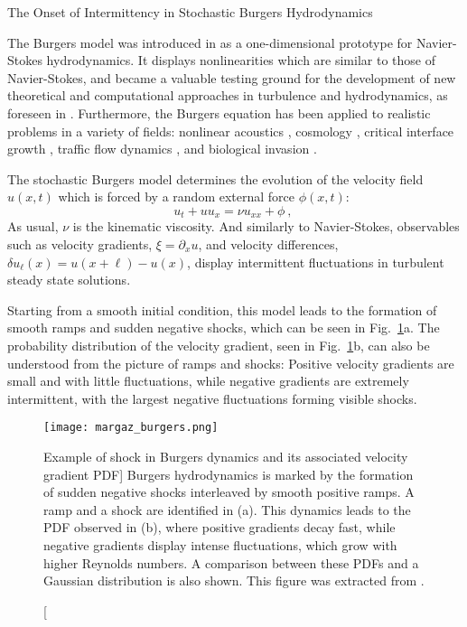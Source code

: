 \begin{chapter}{The Onset of Intermittency in Stochastic Burgers Hydrodynamics}
\label{chap:burgers}

\hspace{5 mm} 

The Burgers model was introduced in \textcite{burgers1948} as a one-dimensional prototype for Navier-Stokes hydrodynamics. It displays nonlinearities which are similar to those of Navier-Stokes, and became a valuable testing ground for the development of new theoretical and computational approaches in turbulence and hydrodynamics, as foreseen in \textcite{vonneumann1963}. Furthermore, the Burgers equation has been applied to realistic problems in a variety of fields: nonlinear acoustics \parencite{gurbatov1991}, cosmology \parencite{zeldovich1970, gurbatov1984}, critical interface growth \parencite{kardar1986}, traffic flow dynamics \parencite{musha1978,chowdhury2000}, and biological invasion \parencite{petrovskii2005}.

The stochastic Burgers model determines the evolution of the velocity field $u(x,t)$ which is forced by a random external force $\phi(x,t)$:
\begin{equation}
u_t + u u_x = \nu u_{xx} + \phi \ , \  \label{eq:nu-burgers}
\end{equation}
As usual, $\nu$ is the kinematic viscosity.
And similarly to Navier-Stokes, observables such as velocity gradients, $\xi = \partial_x u$, and velocity differences, $\delta u_{\ell}(x) = u(x+\ell) - u(x)$, display intermittent fluctuations in turbulent steady state solutions.

Starting from a smooth initial condition, this model leads to the formation of smooth ramps and sudden negative shocks, which can be seen in Fig.~\ref{fig:burgers-shock}a. The probability distribution of the velocity gradient, seen in Fig.~\ref{fig:burgers-shock}b, can also be understood from the picture of ramps and shocks: Positive velocity gradients are small and with little fluctuations, while negative gradients are extremely intermittent, with the largest negative fluctuations forming visible shocks.

\begin{figure}
    \centering
    \texttt{[image: margaz\_burgers.png]}
    \caption
    [Example of shock in Burgers dynamics and its associated velocity gradient PDF]
    {Burgers hydrodynamics is marked by the formation of sudden negative shocks interleaved by smooth positive ramps. A ramp and a shock are identified in (a). This dynamics leads to the PDF observed in (b), where positive gradients decay fast, while negative gradients display intense fluctuations, which grow with higher Reynolds numbers. A comparison between these PDFs and a Gaussian distribution is also shown. This figure was extracted from \textcite{margazoglou2019}.}
    \label{fig:burgers-shock}
\end{figure}


\end{chapter}
